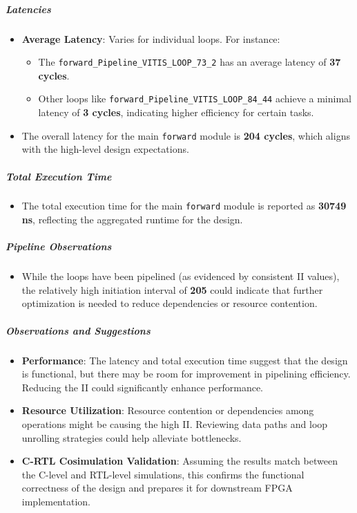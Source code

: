 \documentclass{article}
\begin{document}
\subparagraph{Latencies}
\begin{itemize}
    \item \textbf{Average Latency}: Varies for individual loops. For instance:
    \begin{itemize}
        \item The \texttt{forward\_Pipeline\_VITIS\_LOOP\_73\_2} has an average latency of \textbf{37 cycles}.
        \item Other loops like \texttt{forward\_Pipeline\_VITIS\_LOOP\_84\_44} achieve a minimal latency of \textbf{3 cycles}, indicating higher efficiency for certain tasks.
    \end{itemize}
    \item The overall latency for the main \texttt{forward} module is \textbf{204 cycles}, which aligns with the high-level design expectations.
\end{itemize}

\subparagraph{Total Execution Time}
\begin{itemize}
    \item The total execution time for the main \texttt{forward} module is reported as \textbf{30749 ns}, reflecting the aggregated runtime for the design.
\end{itemize}

\subparagraph{Pipeline Observations}
\begin{itemize}
    \item While the loops have been pipelined (as evidenced by consistent II values), the relatively high initiation interval of \textbf{205} could indicate that further optimization is needed to reduce dependencies or resource contention.
\end{itemize}

\subparagraph{Observations and Suggestions}

\begin{itemize}
    \item \textbf{Performance}: The latency and total execution time suggest that the design is functional, but there may be room for improvement in pipelining efficiency. Reducing the II could significantly enhance performance.
    \item \textbf{Resource Utilization}: Resource contention or dependencies among operations might be causing the high II. Reviewing data paths and loop unrolling strategies could help alleviate bottlenecks.
    \item \textbf{C-RTL Cosimulation Validation}: Assuming the results match between the C-level and RTL-level simulations, this confirms the functional correctness of the design and prepares it for downstream FPGA implementation.
\end{itemize}
\end{document}
